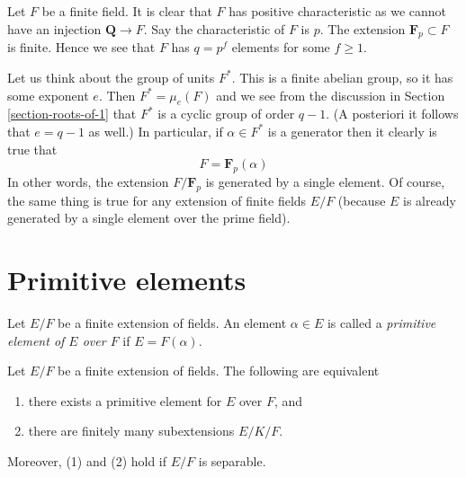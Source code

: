 \noindent
Let $F$ be a finite field. It is clear that $F$ has positive characteristic
as we cannot have an injection $\mathbf{Q} \to F$. Say the characteristic
of $F$ is $p$. The extension $\mathbf{F}_p \subset F$ is finite.
Hence we see that $F$ has $q = p^f$ elements for some $f \geq 1$.

\medskip\noindent
Let us think about the group of units $F^*$. This is a finite abelian
group, so it has some exponent $e$. Then $F^* = \mu_e(F)$ and we see
from the discussion in Section \ref{section-roots-of-1} that $F^*$
is a cyclic group of order $q - 1$. (A posteriori it follows that
$e = q - 1$ as well.) In particular, if $\alpha \in F^*$ is a generator
then it clearly is true that
$$
F = \mathbf{F}_p(\alpha)
$$
In other words, the extension $F/\mathbf{F}_p$ is generated by a single
element. Of course, the same thing is true for any extension of finite
fields $E/F$ (because $E$ is already generated by a single element over
the prime field).





\section{Primitive elements}
\label{section-primitive-element}

\noindent
Let $E/F$ be a finite extension of fields. An element $\alpha \in E$
is called a {\it primitive element of $E$ over $F$} if $E = F(\alpha)$.

\begin{lemma}
\label{lemma-primitive-element}
Let $E/F$ be a finite extension of fields. The following are equivalent
\begin{enumerate}
\item there exists a primitive element for $E$ over $F$, and
\item there are finitely many subextensions $E/K/F$.
\end{enumerate}
Moreover, (1) and (2) hold if $E/F$ is separable.
\end{lemma}

